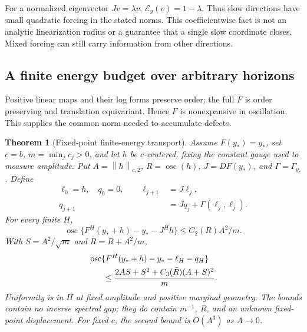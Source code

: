 \documentclass[journal]{IEEEtran}
\newtheorem{theorem}{Theorem}
\theoremstyle{definition}
\newcommand{\norm}[1]{\left\lVert#1\right\rVert}
\DeclareMathOperator{\osc}{osc}
\begin{document}
For a normalized eigenvector $Jv=\lambda v$,
$\mathcal E_y(v)=1-\lambda$. Thus slow directions have small quadratic
forcing in the stated norms. This coefficientwise fact is not an analytic
linearization radius or a guarantee that a single slow coordinate closes.
Mixed forcing can still carry information from other directions.

\subsection{A finite energy budget over arbitrary horizons}
Positive linear maps and their log forms preserve order; the full $F$ is
order preserving and translation equivariant. Hence $F$ is nonexpansive in
oscillation. This supplies the common norm needed to accumulate defects.

\begin{theorem}[Fixed-point finite-energy transport]\label{thm:uniform}
Assume $F(y_*)=y_*$, set $c=b$, $m=\min_jc_j>0$, and let $h$ be
$c$-centered, fixing the constant gauge used to measure amplitude. Put $A=\norm{h}_{c,2}$, $R=\osc(h)$, $J=DF(y_*)$,
and $\Gamma=\Gamma_{y_*}$. Define
\begin{align*}
 \ell_0=h,\quad q_0=0,\qquad
 \ell_{j+1}&=J\ell_j,\\
 q_{j+1}&=Jq_j+\Gamma(\ell_j,\ell_j).
\end{align*}
For every finite $H$,
\begin{equation}
 \osc\{F^H(y_*+h)-y_*-J^Hh\}
 \leq C_2(R)A^2/m.\label{eq:uniform-linear}
\end{equation}
With $S=A^2/\sqrt m$ and $\bar R=R+A^2/m$,
\begin{align}
 &\osc\{F^H(y_*+h)-y_*-\ell_H-q_H\}\nonumber\\
 &\hspace{6mm}\leq
 \frac{2AS+S^2+C_3(\bar R)(A+S)^2}{m}.\label{eq:uniform-jet}
\end{align}
Uniformity is in $H$ at fixed amplitude and positive marginal geometry.
The bounds contain no inverse spectral gap; they do contain $m^{-1}$,
$R$, and an unknown fixed-point displacement. For fixed $c$, the second
bound is $O(A^3)$ as $A\to0$.
\end{theorem}
\end{document}
